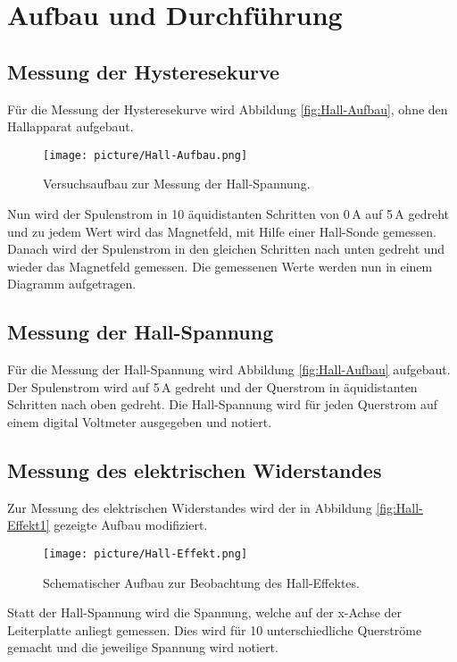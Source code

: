 \section{Aufbau und Durchführung}
\label{sec:Aufbau und Durchführung}

\subsection{Messung der Hysteresekurve}
Für die Messung der Hysteresekurve wird Abbildung \eqref{fig:Hall-Aufbau}, ohne den Hallapparat aufgebaut.

\begin{figure}[H]
  \centering
  \texttt{[image: picture/Hall-Aufbau.png]}
  \caption{Versuchsaufbau zur Messung der Hall-Spannung. \cite{LEIFI}}
  \label{fig:Hall-Aufbau}
\end{figure}

Nun wird der Spulenstrom in 10 äquidistanten Schritten von 0\,A auf 5\,A gedreht und zu jedem Wert wird das Magnetfeld, mit Hilfe einer Hall-Sonde gemessen. Danach wird der Spulenstrom in den gleichen Schritten nach unten gedreht und wieder das Magnetfeld gemessen. Die gemessenen Werte werden nun in einem Diagramm aufgetragen.

\subsection{Messung der Hall-Spannung}
Für die Messung der Hall-Spannung wird Abbildung \eqref{fig:Hall-Aufbau} aufgebaut. Der Spulenstrom wird auf 5\,A gedreht und der Querstrom in äquidistanten Schritten nach oben gedreht. Die Hall-Spannung wird für jeden Querstrom auf einem digital Voltmeter ausgegeben und notiert.

\subsection{Messung des elektrischen Widerstandes}
Zur Messung des elektrischen Widerstandes wird der in Abbildung \eqref{fig:Hall-Effekt1} gezeigte Aufbau modifiziert.

\begin{figure}[H]
	\centering
	\texttt{[image: picture/Hall-Effekt.png]}
	\caption{Schematischer Aufbau zur Beobachtung des Hall-Effektes. \cite[5]{sample}}
	\label{fig:Hall-Effekt1}
\end{figure}

Statt der Hall-Spannung wird die Spannung, welche auf der x-Achse der Leiterplatte anliegt gemessen. Dies wird für 10 unterschiedliche Querströme gemacht und die jeweilige Spannung wird notiert.  
